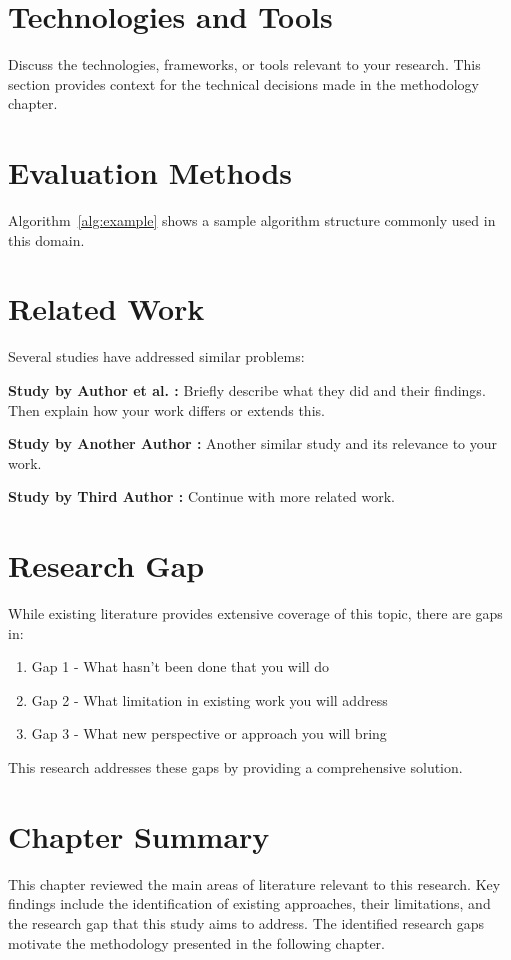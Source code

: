 


\section{Technologies and Tools}
\label{sec:technologies}

Discuss the technologies, frameworks, or tools relevant to your research. This section provides context for the technical decisions made in the methodology chapter.


\section{Evaluation Methods}
\label{sec:evaluation_methods}

Algorithm~\ref{alg:example} shows a sample algorithm structure commonly used in this domain.



\section{Related Work}
\label{sec:related_work}

Several studies have addressed similar problems:

\textbf{Study by Author et al. \cite{sample_ref1}:} Briefly describe what they did and their findings. Then explain how your work differs or extends this.

\textbf{Study by Another Author \cite{sample_ref2}:} Another similar study and its relevance to your work.

\textbf{Study by Third Author \cite{sample_conf1}:} Continue with more related work.


\section{Research Gap}
\label{sec:research_gap}

While existing literature provides extensive coverage of this topic, there are gaps in:

\begin{enumerate}
    \item Gap 1 - What hasn't been done that you will do
    \item Gap 2 - What limitation in existing work you will address
    \item Gap 3 - What new perspective or approach you will bring
\end{enumerate}

This research addresses these gaps by providing a comprehensive solution.


\section{Chapter Summary}
\label{sec:lit_review_summary}

This chapter reviewed the main areas of literature relevant to this research. Key findings include the identification of existing approaches, their limitations, and the research gap that this study aims to address. The identified research gaps motivate the methodology presented in the following chapter.
